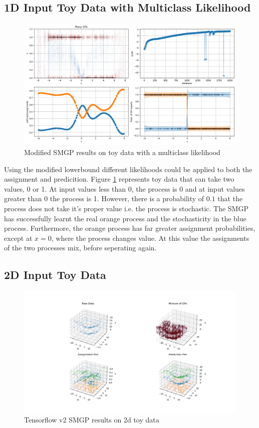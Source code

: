 \documentclass[12pt,a4paper]{report}
\theoremstyle{definition}
\begin{document}
\subsection{1D Input Toy Data with Multiclass Likelihood}

\begin{figure}[H]
    \centering
    \includegraphics[width=\linewidth]{demo_tf2_modified_multiclass.png}
    \caption{Modified SMGP results on toy data with a multiclass likelihood}
    \label{fig:MulticlassSMGPModified}
\end{figure}

Using the modified lowerbound different likelihoods could be applied to both the assignment and predicition.
Figure \ref{fig:MulticlassSMGPModified} represents toy data that can take two values, 0 or 1.
At input values less than 0, the process is 0 and at input values greater than 0 the process is 1.
However, there is a probability of $0.1$ that the process does not take it's proper value i.e. the process is stochastic.
The SMGP has successfully learnt the real orange process and the stochasticity in the blue process.
Furthermore, the orange process has far greater assignment probabilities, except at $x = 0$, where the process changes value.
At this value the assignments of the two processes mix, before seperating again.

\subsection{2D Input Toy Data}

\begin{figure}[H]
    \centering
    \includegraphics[width=\linewidth]{demo_tf2_2d_1.png}
    \caption{Tensorflow v2 SMGP results on 2d toy data}
    \label{fig:2DSMGP1}
\end{figure}
\end{document}
